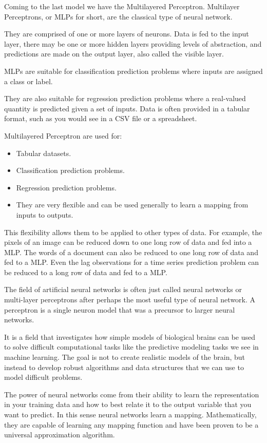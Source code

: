 \documentclass[12pt]{article}
\begin{document}

Coming to the last model we have the Multilayered Perceptron. Multilayer Perceptrons, or MLPs for short, are the classical type of neural network.

They are comprised of one or more layers of neurons. Data is fed to the input layer, there may be one or more hidden layers providing levels of abstraction, and predictions are made on the output layer, also called the visible layer.

MLPs are suitable for classification prediction problems where inputs are assigned a class or label.

They are also suitable for regression prediction problems where a real-valued quantity is predicted given a set of inputs. Data is often provided in a tabular format, such as you would see in a CSV file or a spreadsheet.

Multilayered Perceptron are used for:
\begin{itemize}
\item
Tabular datasets.
\item
Classification prediction problems.
\item
Regression prediction problems.
\item
They are very flexible and can be used generally to learn a mapping from inputs to outputs.
\end{itemize}

This flexibility allows them to be applied to other types of data. For example, the pixels of an image can be reduced down to one long row of data and fed into a MLP. The words of a document can also be reduced to one long row of data and fed to a MLP. Even the lag observations for a time series prediction problem can be reduced to a long row of data and fed to a MLP.

The field of artificial neural networks is often just called neural networks or multi-layer perceptrons after perhaps the most useful type of neural network. A perceptron is a single neuron model that was a precursor to larger neural networks.

It is a field that investigates how simple models of biological brains can be used to solve difficult computational tasks like the predictive modeling tasks we see in machine learning. The goal is not to create realistic models of the brain, but instead to develop robust algorithms and data structures that we can use to model difficult problems.

The power of neural networks come from their ability to learn the representation in your training data and how to best relate it to the output variable that you want to predict. In this sense neural networks learn a mapping. Mathematically, they are capable of learning any mapping function and have been proven to be a universal approximation algorithm.
\end{document}
